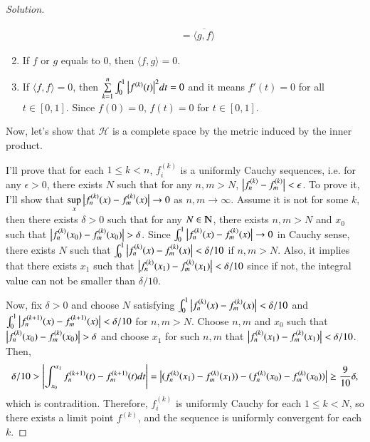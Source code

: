 \documentclass[a4paper, 12pt]{article}
\theoremstyle{Mydefinition}
\theoremstyle{Mytheorem}
\begin{document}
\begin{proof}[Solution]
\begin{enumerate}
\begin{equation}
\begin{split}
        &= \overline{ \langle g,f\rangle}
        \end{split}
    \end{equation}
    \item If $f$ or $g$ equals to $0$, then $\langle f,g\rangle = 0$.
    \item If $\langle f,f\rangle = 0$, then $\sum\limits_{k=1}^n \int_0^1 \abs{f^{(k)}(t)}^2dt = 0$ and it means $f'(t) = 0$ for all $t\in[0,1]$. Since $f(0) = 0$, $f(t)=0$ for $t\in[0,1]$. 
\end{enumerate}
Now, let's show that $\mathscr{H}$ is a complete space by the metric induced by the inner product.

I'll prove that for each $1\leq k<n$, $f^{(k)}_i$ is a uniformly Cauchy sequences, i.e. for any $\epsilon>0$, there exists $N$ such that for any $n,m>N$, $\abs{f^{(k)}_n-f^{(k)}_m}<\epsilon$. To prove it, I'll show that $\sup\limits_{x} \abs{f^{(k)}_n(x)-f^{(k)}_m(x)}\rightarrow 0$ as $n,m\rightarrow \infty$. Assume it is not for some $k$, then there exists $\delta>0$ such that for any $N\in \varmathbb{N}$, there exists $n,m>N$ and $x_0$ such that $\abs{f^{(k)}_n(x_0)-f^{(k)}_m(x_0)}>\delta$. Since $\int_0^1 \abs{f^{(k)}_n(x)-f^{(k)}_m(x)}\rightarrow 0$ in Cauchy sense, there exists $N$ such that $\int_0^1 \abs{f^{(k)}_n(x)-f^{(k)}_m(x)}<\delta/10$ if $n,m>N$. Also, it implies that there exists $x_1$ such that $\abs{f^{(k)}_n(x_1)-f^{(k)}_m(x_1)}<\delta/10$ since if not, the integral value can not be smaller than $\delta/10$.

Now, fix $\delta>0$ and choose $N$ satisfying $\int_0^1 \abs{f^{(k)}_n(x)-f^{(k)}_m(x)}<\delta/10$ and $\int_0^1 \abs{f^{(k+1)}_n(x)-f^{(k+1)}_m(x)}<\delta/10$ for $n,m>N$. Choose $n,m$ and $x_0$ such that $\abs{f^{(k)}_n(x_0)-f^{(k)}_m(x_0)}>\delta$ and choose $x_1$ for such $n,m$ that $\abs{f^{(k)}_n(x_1)-f^{(k)}_m(x_1)}<\delta/10$. Then,
\begin{equation}
   \delta/10>\abs{\int_{x_0}^{x_1} f^{(k+1)}_n(t)-f^{(k+1)}_m(t)dt} =  \abs{(f^{(k)}_n(x_1) - f^{(k)}_m(x_1))-(f^{(k)}_n(x_0) - f^{(k)}_m(x_0))}\geq \frac{9}{10}\delta,
\end{equation}
which is contradition. Therefore, $f^{(k)}_i$ is uniformly Cauchy for each $1\leq k<N$, so there exists a limit point $f^{(k)}$, and the sequence is uniformly convergent for each $k$. 


\end{proof}
\end{document}
